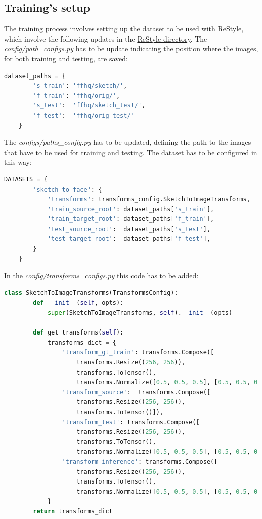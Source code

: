 \subsection{Training's setup}
The training process involves setting up the dataset to be used with ReStyle, which involve the following updates in the  \href{https://github.com/yuval-alaluf/restyle-encoder}{ReStyle directory}. The  \textit{config/path\_configs.py} has to be update indicating the position where the images, for both training and testing, are saved:
\begin{lstlisting}[language=Python, numbers=none]
    dataset_paths = {
        's_train': 'ffhq/sketch/',
        'f_train': 'ffhq/orig/',
        's_test':  'ffhq/sketch_test/',
        'f_test':  'ffhq/orig_test/'
    }
\end{lstlisting}
The \textit{configs/paths\_config.py} has to be updated, defining the path to the images that have to be used for training and testing. The dataset has to be configured in this way:
\begin{lstlisting}[language=Python, numbers=none]
    DATASETS = {
        'sketch_to_face': {
            'transforms': transforms_config.SketchToImageTransforms,
            'train_source_root': dataset_paths['s_train'],
            'train_target_root': dataset_paths['f_train'],
            'test_source_root':  dataset_paths['s_test'],
            'test_target_root':  dataset_paths['f_test'],
        }
    }
\end{lstlisting}
In the \textit{config/transforms\_configs.py} this code has to be added:
\begin{lstlisting}[language=Python, numbers=none]
    class SketchToImageTransforms(TransformsConfig):
        def __init__(self, opts):
            super(SketchToImageTransforms, self).__init__(opts)
    
        def get_transforms(self):
            transforms_dict = {
                'transform_gt_train': transforms.Compose([
                    transforms.Resize((256, 256)),
                    transforms.ToTensor(),
                    transforms.Normalize([0.5, 0.5, 0.5], [0.5, 0.5, 0.5])]),
                'transform_source':  transforms.Compose([
                    transforms.Resize((256, 256)),
                    transforms.ToTensor()]),
                'transform_test': transforms.Compose([
                    transforms.Resize((256, 256)),
                    transforms.ToTensor(),
                    transforms.Normalize([0.5, 0.5, 0.5], [0.5, 0.5, 0.5])]),
                'transform_inference': transforms.Compose([
                    transforms.Resize((256, 256)),
                    transforms.ToTensor(),
                    transforms.Normalize([0.5, 0.5, 0.5], [0.5, 0.5, 0.5])])
            }
        return transforms_dict
\end{lstlisting}
